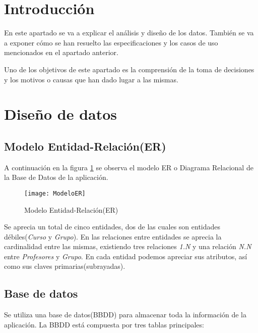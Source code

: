 
\section{Introducción}
En este apartado se va a explicar el análisis y diseño de los datos. También se va a exponer cómo se han resuelto las especificaciones y los casos de uso mencionados en el apartado anterior.  

Uno de los objetivos de este apartado es la comprensión  de la toma de decisiones y los motivos o causas que han dado lugar a las mismas.

\section{Diseño de datos}


\subsection{Modelo Entidad-Relación(ER)}
A continuación en la figura \ref{fig:ModeloER} se observa el modelo ER o Diagrama Relacional de la Base de Datos de la aplicación.


\begin{figure}%
		\centering
		\texttt{[image: ModeloER]}
		\caption{Modelo Entidad-Relación(ER)}\label{fig:ModeloER}
	\end{figure}


Se aprecia un total de cinco entidades, dos de las cuales son entidades débiles(\emph{Curso} y \emph{Grupo}). En las relaciones entre entidades se aprecia la cardinalidad entre las mismas, existiendo tres relaciones \emph{1.N} y una relación \emph{N.N} entre \emph{Profesores} y \emph{Grupo}. En cada entidad podemos apreciar sus atributos, así como sus claves primarias(subrayadas).



\subsection{Base de datos}
Se utiliza una base de datos(BBDD) para almacenar toda la información de la aplicación. La BBDD está compuesta por tres tablas principales:



